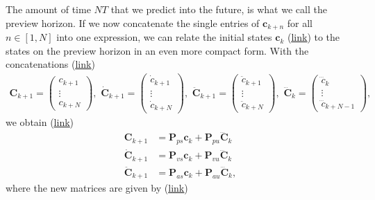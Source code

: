 The amount of time $NT$ that we predict into the future, is what we call the preview horizon. If we now concatenate the single entries of $\bm{c}_{k+n}$ for all $n\in[1,N]$ into one expression, we can relate the initial states $\bm{c}_k$ (\href{https://github.com/mhubii/nmpc_pattern_generator/blob/5a213044c927dc6aac9f7e32ce1e5fb472cd67bb/libs/pattern_generator/include/pattern_generator/base_generator.h#L140}{\underline{link}}) to the states on the preview horizon in an even more compact form. With the concatenations (\href{https://github.com/mhubii/nmpc_pattern_generator/blob/5a213044c927dc6aac9f7e32ce1e5fb472cd67bb/libs/pattern_generator/include/pattern_generator/base_generator.h#L146}{\underline{link}})
\begin{align}
	\bm{C}_{k+1}=\begin{pmatrix}
	c_{k+1}\\
	\vdots\\
	c_{k+N}
	\end{pmatrix},\,\,
	\dot{\bm{C}}_{k+1}=\begin{pmatrix}
	\dot{c}_{k+1}\\
	\vdots\\
	\dot{c}_{k+N}
	\end{pmatrix},\,\,
	\ddot{\bm{C}}_{k+1}=\begin{pmatrix}
	\ddot{c}_{k+1}\\
	\vdots\\
	\ddot{c}_{k+N}
	\end{pmatrix},\,\,
	\dddot{\bm{C}}_{k}=\begin{pmatrix}
	\dddot{c}_{k}\\
	\vdots\\
	\dddot{c}_{k+N-1}
	\end{pmatrix},
\end{align}
we obtain (\href{https://github.com/mhubii/nmpc_pattern_generator/blob/5a213044c927dc6aac9f7e32ce1e5fb472cd67bb/libs/pattern_generator/src/base_generator.cpp#L887}{\underline{link}})
\begin{align}
	\bm{C}_{k+1} &= \bm{P}_{ps} \bm{c}_k + \bm{P}_{pu}\dddot{\bm{C}}_k
	\label{eq::212_ckp1}\\
	\dot{\bm{C}}_{k+1} &= \bm{P}_{vs} \bm{c}_k + \bm{P}_{vu}\dddot{\bm{C}}_k
	\label{eq::212_dckp1}\\
	\ddot{\bm{C}}_{k+1} &= \bm{P}_{as} \bm{c}_k + \bm{P}_{au}\dddot{\bm{C}}_k,
	\label{eq::212_ddckp1}
\end{align}
where the new matrices are given by (\href{https://github.com/mhubii/nmpc_pattern_generator/blob/5a213044c927dc6aac9f7e32ce1e5fb472cd67bb/libs/pattern_generator/src/base_generator.cpp#L403}{\underline{link}})
